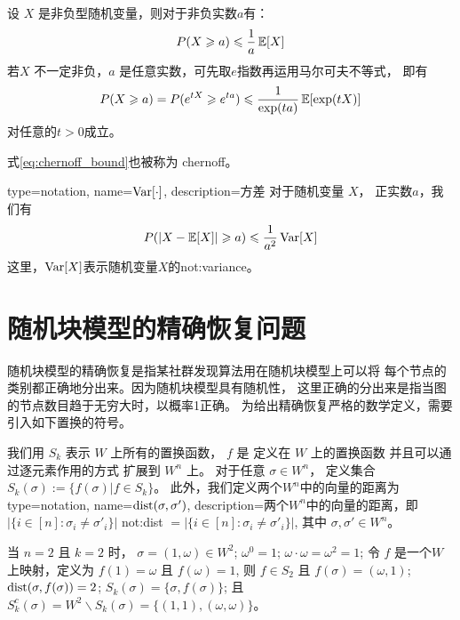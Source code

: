 \begin{lemma} 
  设 $X$ 是非负型随机变量，则对于非负实数$a$有：
  \begin{equation}
    P(X\geqslant a) \leqslant {1 \over a} \operatorname{\mathbb{E}}[X]   
  \end{equation}
   若$X$ 不一定非负，$a$ 是任意实数，可先取$e$指数再运用马尔可夫不等式，
   即有
   \begin{equation}\label{eq:chernoff_bound}
    P(X\geqslant a) = P(e^{tX} \geqslant e^{ta}) \leqslant { 1 \over \exp(ta)} \operatorname{\mathbb{E}}[\exp(tX)]
   \end{equation}
   对任意的$t>0$成立。

   式\eqref{eq:chernoff_bound}也被称为 \gls{chernoff}。
\end{lemma}
\begin{lemma}
{
  type=notation,
  name={$\operatorname{\mathrm{Var}}[\cdot]$},
  description={方差}
}
  对于随机变量 $X$， 正实数$a$，我们有
  \begin{equation}
    P(\lvert X-\operatorname{\mathbb{E}}[X]\rvert \geqslant a) \leqslant {1 \over a^2} \operatorname{\mathrm{Var}}[X]
  \end{equation}
  这里，$\operatorname{\mathrm{Var}}[X]$表示随机变量$X$的\glsdesc{not:variance}。
\end{lemma}


\section{随机块模型的精确恢复问题}\label{sec:exact_recovery}
随机块模型的精确恢复是指某社群发现算法用在随机块模型上可以将
每个节点的类别都正确地分出来。因为随机块模型具有随机性，
这里正确的分出来是指当图的节点数目趋于无穷大时，以概率1正确。
为给出精确恢复严格的数学定义，需要引入如下置换的符号。


我们用 $S_k$ 表示 $W$  上所有的置换函数， 
$f$ 是 定义在 $W$ 上的置换函数
并且可以通过逐元素作用的方式
扩展到 $W^n$ 上。
对于任意 $\sigma \in W^n$，
定义集合 $S_k(\sigma):=\{f(\sigma)| f\in S_k\}$。
此外，我们定义两个$W^n$中的向量的距离为
{
  type=notation,
  name={$\operatorname{dist}(\sigma, \sigma')$},
  description={两个$W^n$中的向量的距离，即$|\{i\in[n]:\sigma_i\neq \sigma'_i\}|$}
}
\gls{not:dist}
$=|\{i\in[n]:\sigma_i\neq \sigma'_i\}|$,
其中 $\sigma,\sigma'\in W^n
$。
\begin{example}
当 $n=2$ 且 $k=2$ 时，
$\sigma=(1, \omega) \in W^2$;
$\omega^0 = 1$; $\omega \cdot \omega = \omega^2 = 1$;
令 $f$ 是一个$W$上映射，定义为
$f(1) = \omega$ 且 $f(\omega)=1$,
则 $f \in S_2$ 且 $f(\sigma) = (\omega, 1)$;
$\operatorname{dist}(\sigma, f(\sigma)) = 2$;
$S_k(\sigma) = \{\sigma, f(\sigma)\}$; 且
$S_k^c(\sigma) = W^2 \backslash S_k(\sigma)
=\{(1, 1), (\omega, \omega)\}$。
\end{example}

